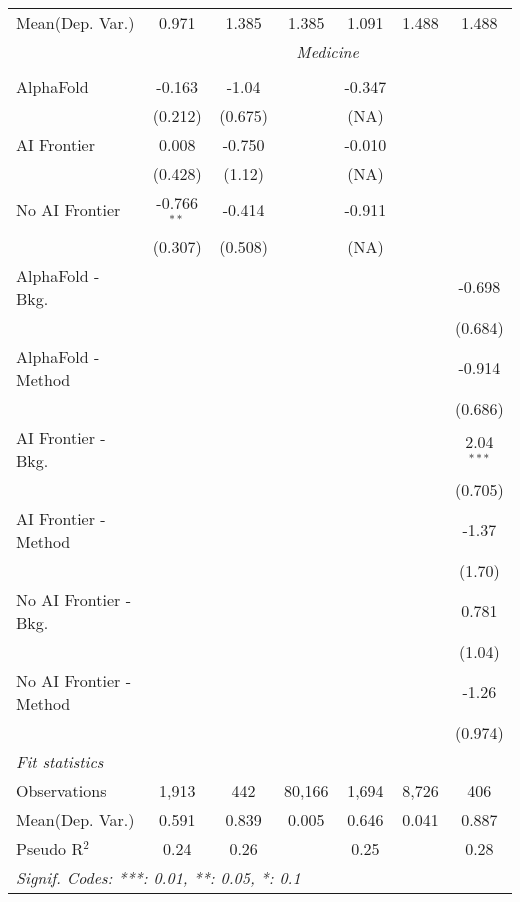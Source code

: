 \begin{tabular}{lcccccc}
Mean(Dep. Var.) & 0.971 & 1.385 & 1.385 & 1.091 & 1.488 & 1.488 \\
 & \multicolumn{6}{c}{\textit{Medicine}} \\ \\
   AlphaFold               & -0.163        & -1.04     &        & -0.347    &       &   \\   
                           & (0.212)       & (0.675)   &        & (NA)      &       &   \\   
   AI Frontier             & 0.008         & -0.750    &        & -0.010    &       &   \\   
                           & (0.428)       & (1.12)    &        & (NA)      &       &   \\   
   No AI Frontier          & -0.766$^{**}$ & -0.414    &        & -0.911    &       &   \\   
                           & (0.307)       & (0.508)   &        & (NA)      &       &   \\   
   AlphaFold - Bkg.        &               &           &        &           &       & -0.698\\   
                           &               &           &        &           &       & (0.684)\\   
   AlphaFold - Method      &               &           &        &           &       & -0.914\\   
                           &               &           &        &           &       & (0.686)\\   
   AI Frontier - Bkg.      &               &           &        &           &       & 2.04$^{***}$\\   
                           &               &           &        &           &       & (0.705)\\   
   AI Frontier - Method    &               &           &        &           &       & -1.37\\   
                           &               &           &        &           &       & (1.70)\\   
   No AI Frontier - Bkg.   &               &           &        &           &       & 0.781\\   
                           &               &           &        &           &       & (1.04)\\   
   No AI Frontier - Method &               &           &        &           &       & -1.26\\   
                           &               &           &        &           &       & (0.974)\\   
   \midrule
   \emph{Fit statistics}\\
   Observations            & 1,913         & 442       & 80,166 & 1,694     & 8,726 & 406\\  
Mean(Dep. Var.) & 0.591 & 0.839 & 0.005 & 0.646 & 0.041 & 0.887 \\
   Pseudo R$^2$            & 0.24          & 0.26      &        & 0.25      &       & 0.28\\  
   \midrule \midrule
   \multicolumn{7}{l}{\emph{Signif. Codes: ***: 0.01, **: 0.05, *: 0.1}}\\
\end{tabular}
\par\endgroup
